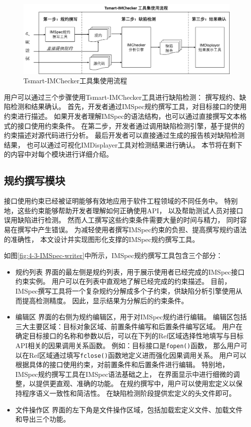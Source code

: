 \begin{figure}[t]
	\centering
	\includegraphics[width=\linewidth]{figures/cp4-overview.png}
	\caption{
		Tsmart-IMChecker工具集使用流程
	}
	\label{fig:4-3-overview}
\end{figure}

用户可以通过三个步骤使用Tsmart-IMChecker工具进行缺陷检测：
撰写规约、缺陷检测和结果确认。
首先，开发者通过IMSpec规约撰写工具，对目标接口的使用约束进行描述。
如果开发者理解IMSpec的语法结构，也可以通过直接撰写文本格式的接口使用约束条件。
在第二步，开发者通过调用缺陷检测引擎，基于提供的约束描述对源代码进行分析。
最后开发者可以直接通过生成的报告核对缺陷检测结果，
也可以通过可视化IMDisplayer工具对检测结果进行确认。
本节将在剩下的内容中对每个模块进行详细介绍。


\subsection{规约撰写模块}
接口使用约束已经被证明能够有效地应用于软件工程领域的不同任务中。
特别地，这些约束能够帮助开发者理解如何正确使用API，
以及帮助测试人员对接口误用缺陷进行检测。
然而人工撰写这些约束条件需要大量的时间与精力，
同时容易在撰写中产生错误。
为减轻使用者撰写IMSpec约束的负担、提高撰写规约语法的准确性，
本文设计并实现图形化支撑的IMSpec规约撰写工具。

如图\ref{fig:4-3-IMSpec-writer}中所示，IMSpec规约撰写工具包含三个部分：
\begin{itemize}
	\item {\kaishu 规约列表}
	界面的最左侧是规约列表，用于展示使用者已经完成的IMSpec接口约束实例。
	用户可以在列表中直观地了解已经完成的约束描述。
	目前，IMSpec撰写工具将一个复杂规约分解成多个子约束，供缺陷分析引擎使用从而提高检测精度。
	因此，显示结果为分解后的约束条件。
	\item {\kaishu 编辑区} 
	界面的右侧为规约编辑区，用于对IMSpec规约进行编辑。
	编辑区包括三大主要区域：目标对象区域、前置条件编写和后置条件编写区域。
	用户在确定目标接口的名称和参数以后，可以在下列的Ref区域选择性地填写与目标API相关的因果调用关系函数。
	例如：目标接口是\texttt{fopen()}函数，
	那么用户可以在Ref区域通过填写\texttt{fclose()}函数地定义进而强化因果调用关系。
	用户可以根据具体的接口使用约束，对前置条件和后置条件进行编辑。
	特别地，IMSpec规约撰写工具在IMSpec语法基础之上，
	在界面显示中进行细微的调整，以提供更直观、准确的功能。
	在规约撰写中，用户可以使用宏定义以保持程序语义一致性和简洁性。
	在缺陷检测阶段提供宏定义的头文件即可。
	\item {\kaishu 文件操作区} 
	界面的左下角是文件操作区域，包括加载宏定义文件、加载文件和导出三个功能。
	
\end{itemize}

